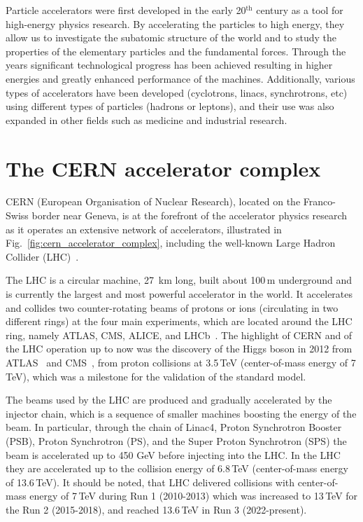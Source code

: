 \thispagestyle{simple} %
Particle accelerators were first developed in the early 20$^\mathrm{th}$ century as a tool for high-energy physics research. By accelerating the particles to high energy, they allow us to investigate the subatomic structure of the world and to study the properties of the elementary particles and the fundamental forces. Through the years significant technological progress has been achieved resulting in higher energies and greatly enhanced performance of the machines. Additionally, various types of accelerators have been developed (cyclotrons, linacs, synchrotrons, etc) using different types of particles (hadrons or leptons), and their use was also expanded in other fields such as medicine and industrial research. 
\section{The CERN accelerator complex}
CERN (European Organisation of Nuclear Research), located on the Franco-Swiss border near Geneva, is at the forefront of the accelerator physics research as it operates an extensive network of accelerators, illustrated in Fig.~\ref{fig:cern_accelerator_complex}, including the well-known Large Hadron Collider (LHC)~\cite{Brüning:782076}.

The LHC is a circular machine, 27\, km long, built about 100\,m underground and is currently the largest and most powerful accelerator in the world. It accelerates and collides two counter-rotating beams of protons or ions (circulating in two different rings) at the four main experiments, which are located around the LHC ring, namely ATLAS, CMS, ALICE, and LHCb~\cite{ATLAS:2008xda, CMS:2008xjf, ALICE:2008ngc, Alves:1129809}. The highlight of CERN and of the LHC operation up to now was the discovery of the Higgs boson in 2012 from ATLAS~\cite{ATLAS_Higgs} and CMS~\cite{CMS_Higgs}, from proton collisions at 3.5\,TeV (center-of-mass energy of 7\,TeV), which was a milestone for the validation of the standard model. %

The beams used by the LHC are produced and gradually accelerated by the injector chain, which is a sequence of smaller machines boosting the energy of the beam. In particular, through the chain of Linac4, Proton Synchrotron Booster (PSB), Proton Synchrotron (PS), and the Super Proton Synchrotron (SPS) the beam is accelerated up to 450 GeV before injecting into the LHC. In the LHC they are accelerated up to the collision energy of 6.8\,TeV (center-of-mass energy of 13.6\,TeV). It should be noted, that LHC delivered collisions with center-of-mass energy of 7\,TeV during Run 1 (2010-2013) which was increased to 13\,TeV for the Run 2 (2015-2018), and reached 13.6\,TeV in Run 3 (2022-present). 

